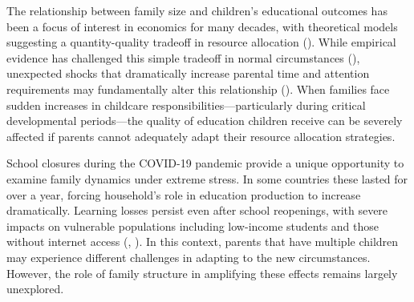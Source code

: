 






The relationship between family size and children's educational outcomes has been a focus of interest in economics for many decades, with theoretical models suggesting a quantity-quality tradeoff in resource allocation (\cite{becker_child_1976}). While empirical evidence has challenged this simple tradeoff in normal circumstances (\cite{black_more_2005}), unexpected shocks that dramatically increase parental time and attention requirements may fundamentally alter this relationship (\cite{black_recent_2010}). When families face sudden increases in childcare responsibilities—particularly during critical developmental periods—the quality of education children receive can be severely affected if parents cannot adequately adapt their resource allocation strategies.


School closures during the COVID-19 pandemic provide a unique opportunity to examine family dynamics under extreme stress. In some countries these lasted for over a year, forcing household's role in education production to increase dramatically. Learning losses persist even after school reopenings, with severe impacts on vulnerable populations including low-income students and those without internet access (\cite{haelermans_inequality_2022}, \cite{jakubowski_global_2023}). In this context, parents that have multiple children may experience different challenges in adapting to the new circumstances. However, the role of family structure in amplifying these effects remains largely unexplored.\textbf{}

